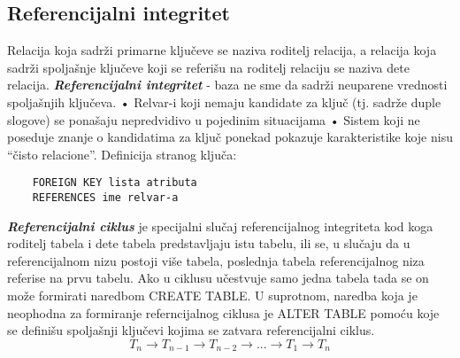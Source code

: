 \documentclass{article}
\begin{document}
\subsection{Referencijalni integritet}
Relacija koja sadrži primarne ključeve se naziva roditelj relacija, a
relacija koja sadrži spoljašnje ključeve koji se referišu na
roditelj relaciju se naziva dete relacija.
\textit{\textbf{Referencijalni integritet}} - baza ne sme da sadrži
neuparene vrednosti spoljašnjih ključeva.
\newline \hspace*{0.2cm}• Relvar-i koji nemaju kandidate za ključ (tj.
sadrže duple slogove) se ponašaju nepredvidivo u pojedinim situacijama
\newline \hspace*{0.2cm}• Sistem koji ne poseduje znanje o kandidatima
za ključ ponekad pokazuje karakteristike koje nisu “čisto relacione”.
\newline Definicija stranog ključa:
\begin{verbatim}
    FOREIGN KEY lista atributa
    REFERENCES ime relvar-a
\end{verbatim}
\textit{\textbf{Referencijalni ciklus}} je specijalni slučaj
referencijalnog integriteta kod koga roditelj tabela i dete tabela
predstavljaju istu tabelu, ili se, u slučaju da u referencijalnom nizu
postoji više tabela, poslednja tabela referencijalnog niza referise na
prvu tabelu. Ako u ciklusu učestvuje samo jedna tabela tada se on može
formirati naredbom CREATE TABLE. U suprotnom, naredba koja je neophodna
za formiranje referncijalnog ciklusa je ALTER TABLE pomoću koje se
definišu spoljašnji ključevi kojima se zatvara referencijalni ciklus.
$$T_n \rightarrow T_{n-1} \rightarrow T_{n-2} \rightarrow ...
\rightarrow T_1 \rightarrow T_n$$
\end{document}
